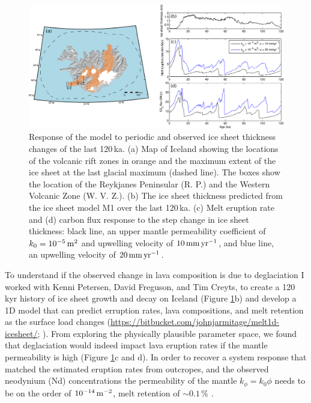 \begin{figure}
\centering
\includegraphics[width=\textwidth]{./figures/ch2-iceland-map.png}
\caption{Response of the model to periodic and observed ice sheet thickness changes of the last 120\,ka. (a) Map of Iceland showing the locations of the volcanic rift zones in orange and the maximum extent of the ice sheet at the last glacial maximum (dashed line). The boxes show the location of the Reykjanes Peninsular (R. P.) and the Western Volcanic Zone (W. V. Z.). (b) The ice sheet thickness predicted from the ice sheet model M1 over the last 120\,ka. (c) Melt eruption rate and (d) carbon flux response to the step change in ice sheet thickness: black line, an upper mantle permeability coefficient of $k_{0} = 10^{-5}\rm\,m^{2}$ and upwelling velocity of $10\rm\,mm\,yr^{-1}$, and blue line, an upwelling velocity of $20\rm\,mm\,yr^{-1}$.}
\label{fg:iceland-map}
\end{figure}

To understand if the observed change in lava composition is due to deglaciation I worked with Kenni Petersen, David Freguson, and Tim Creyts, to create a 120\,kyr history of ice sheet growth and decay on Iceland (Figure \ref{fg:iceland-map}b) and develop a 1D model that can predict erruption rates, lava compositions, and melt retention as the surface load changes (\url{https://bitbucket.com/johnjarmitage/melt1d-icesheet/}; \citealp{armitage-etal-grl-2019}). From exploring the physically plausible parameter space, we found that deglaciation would indeed impact lava eruption rates if the mantle permeability is high (Figure \ref{fg:iceland-map}c and d). In order to recover a system response that matched the estimated eruption rates from outcropes, and the observed neodynium (Nd) concentrations the permeability of the mantle $k_{\phi} = k_{0}\phi$ needs to be on the order of $10^{-14}\rm\,m^{-2}$, melt retention of $\sim 0.1$\,\% \citep{armitage-etal-grl-2019}.

